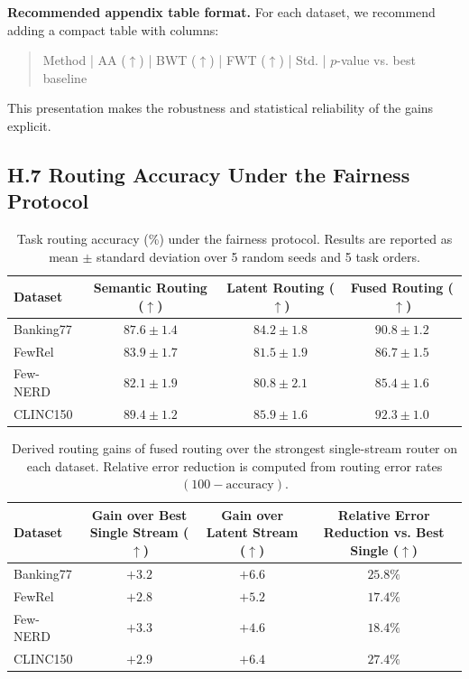 \documentclass[11pt]{article}
\begin{document}
\textbf{Recommended appendix table format.}
For each dataset, we recommend adding a compact table with columns:
\begin{quote}
Method | AA ($\uparrow$) | BWT ($\uparrow$) | FWT ($\uparrow$) | Std. | $p$-value vs. best baseline
\end{quote}
This presentation makes the robustness and statistical reliability of the gains explicit.

\subsection*{H.7 Routing Accuracy Under the Fairness Protocol}

\begin{table}[t]
\centering
\begin{tabular}{lccc}
\toprule
Dataset & Semantic Routing ($\uparrow$) & Latent Routing ($\uparrow$) & Fused Routing ($\uparrow$) \\
\midrule
Banking77 & $87.6 \pm 1.4$ & $84.2 \pm 1.8$ & $\mathbf{90.8 \pm 1.2}$ \\
FewRel & $83.9 \pm 1.7$ & $81.5 \pm 1.9$ & $\mathbf{86.7 \pm 1.5}$ \\
Few-NERD & $82.1 \pm 1.9$ & $80.8 \pm 2.1$ & $\mathbf{85.4 \pm 1.6}$ \\
CLINC150 & $89.4 \pm 1.2$ & $85.9 \pm 1.6$ & $\mathbf{92.3 \pm 1.0}$ \\
\bottomrule
\end{tabular}
\caption{Task routing accuracy (\%) under the fairness protocol. Results are reported as mean $\pm$ standard deviation over 5 random seeds and 5 task orders.}
\label{tab:routing-accuracy-fair}
\end{table}

\begin{table}[t]
\centering
\begin{tabular}{lccc}
\toprule
Dataset & Gain over Best Single Stream ($\uparrow$) & Gain over Latent Stream ($\uparrow$) & Relative Error Reduction vs. Best Single ($\uparrow$) \\
\midrule
Banking77 & $+3.2$ & $+6.6$ & $25.8\%$ \\
FewRel & $+2.8$ & $+5.2$ & $17.4\%$ \\
Few-NERD & $+3.3$ & $+4.6$ & $18.4\%$ \\
CLINC150 & $+2.9$ & $+6.4$ & $27.4\%$ \\
\bottomrule
\end{tabular}
\caption{Derived routing gains of fused routing over the strongest single-stream router on each dataset. Relative error reduction is computed from routing error rates $(100-\text{accuracy})$.}
\label{tab:routing-derived-gains}
\end{table}
\end{document}
